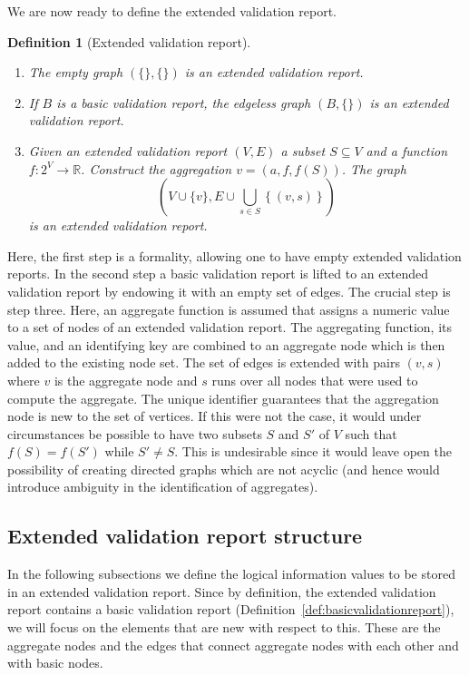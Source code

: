 \documentclass[a4paper, 11pt,titlepage]{article}
\newtheorem{definition}{Definition}
\begin{document}
We are now ready to define the extended validation report.
%
\begin{definition}[Extended validation report]\leavevmode
\label{def:extvalrep}
\begin{enumerate}
\item The empty graph $(\{\},\{\})$ is an extended validation report.
\item If $B$ is a basic validation report, the edgeless graph $(B, \{\})$ is an
extended validation report.
\item Given an extended validation report $(V,E)$  a subset $S\subseteq V$ and
a function $f:2^V\to\mathbb{R}$. Construct the aggregation $v=(a,f,f(S))$.
The graph
\begin{displaymath}
\left(
V\cup \{v\}, E\cup \bigcup_{s\in S}\left\{( v, s )\right\}
\right)
\end{displaymath}
is an extended validation report.
\end{enumerate}
\end{definition}
Here, the first step is a formality, allowing one to have empty extended
validation reports. In the second step a basic validation report is lifted to
an extended validation report by endowing it with an empty set of edges. The
crucial step is step three. Here, an aggregate function is assumed that assigns
a numeric value to a set of nodes of an extended validation report.  The
aggregating function, its value, and an identifying key are combined to an
aggregate node which is then added to the existing node set. The set of edges
is extended with pairs $(v,s)$ where $v$ is the aggregate node and $s$ runs
over all nodes that were used to compute the aggregate.  The unique identifier
guarantees that the aggregation node is new to the set of vertices. If this
were not the case, it would under circumstances be possible to have two subsets
$S$ and $S'$ of $V$ such that $f(S)=f(S')$ while $S'\not=S$. This is
undesirable since it would leave open the possibility of creating directed
graphs which are not acyclic (and hence would introduce ambiguity in the
identification of aggregates).






\subsection{Extended validation report structure}
\label{sect:extendedreport}
In the following subsections we define the logical information values to be
stored in an extended validation report. Since by definition, the extended
validation report contains a basic validation report
(Definition~\ref{def:basicvalidationreport}), we will focus on the elements
that are new with respect to this.  These are the aggregate nodes and the edges
that connect aggregate nodes with each other and with basic nodes. 
\end{document}
